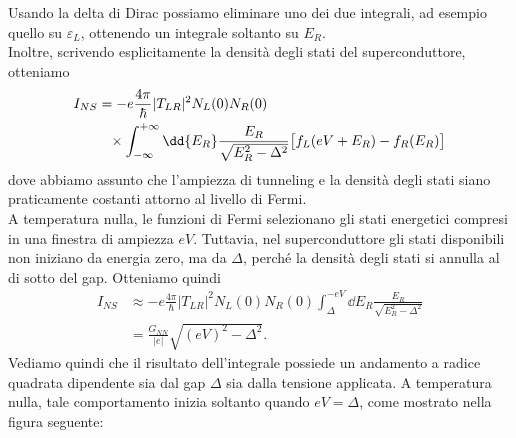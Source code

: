Usando la delta di Dirac possiamo eliminare uno dei due integrali, ad esempio quello su $\varepsilon_L$, ottenendo un integrale soltanto su $E_R$.\\
Inoltre, scrivendo esplicitamente la densità degli stati del superconduttore, otteniamo
\begin{equation*}
    \begin{split}
        I_{NS}
        &=
        -e
        \frac{4\pi}{\hbar}
        |T_{LR}|^2
        N_L(0)
        N_R(0)
        \\
        & \hphantom{=}
        \times
        \int_{-\infty}^{+\infty}
        \dd{E_R}
        \frac{
            E_R
        }{
            \sqrt{
                E_R^2-\Delta^2
            }
        }
        \bigl[
            f_L(eV+E_R)
            -
            f_R(E_R)
        \bigr]
    \end{split}
\end{equation*}
dove abbiamo assunto che l'ampiezza di tunneling e la densità degli stati siano praticamente costanti attorno al livello di Fermi.\\
A temperatura nulla, le funzioni di Fermi selezionano gli stati energetici compresi in una finestra di ampiezza $eV$. Tuttavia, nel superconduttore gli stati disponibili non iniziano da energia zero, ma da $\Delta$, perché la densità degli stati si annulla al di sotto del gap. Otteniamo quindi
\begin{equation*}
    \begin{split}
        I_{NS}
        &\approx
        -e
        \frac{4\pi}{\hbar}
        |T_{LR}|^2
        N_L(0)
        N_R(0)
        \int_{\Delta}^{-eV}
        \dd{E_R}
        \frac{
            E_R
        }{
            \sqrt{
                E_R^2-\Delta^2
            }
        }
        \\
        &=
        \frac{
            G_{NN}
        }{
            |e|
        }
        \sqrt{
            (eV)^2-\Delta^2
        }.
    \end{split}
\end{equation*}
Vediamo quindi che il risultato dell'integrale possiede un andamento a radice quadrata dipendente sia dal gap $\Delta$ sia dalla tensione applicata. A temperatura nulla, tale comportamento inizia soltanto quando $eV=\Delta$, come mostrato nella figura seguente:
